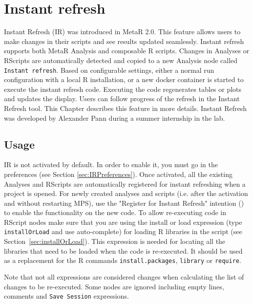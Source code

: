 

\chapter{Instant refresh}\label{chap:InstantRefresh}
Instant Refresh (IR) was introduced in MetaR 2.0. This feature allows users to make changes in their scripts and see results updated seamlessly. Instant refresh supports both MetaR Analysis and composable R scripts.  
Changes in Analyses or RScripts are automatically detected and copied to a new Analysis node called \texttt{Instant refresh}. Based on configurable settings, either a normal run configuration with a local R installation, or a new docker container is started to execute the instant refresh code. Executing the code regenerates tables or plots and updates the display. Users can follow progress of the refresh in the Instant Refresh tool. This Chapter describes this feature in more details. Instant Refresh was developed by Alexander Pann during a summer internship in the lab.

\section{Usage}
IR is not activated by default. In order to enable it, you must go in the preferences (see Section \ref{sec:IRPreferences}). Once activated, all the existing Analyses and RScripts are automatically registered for instant refreshing when a project is opened. For newly created analyses and scripts (i.e. after the activation and without restarting MPS), use the "Register for Instant Refresh" intention (\intentionLightBulb) to enable the functionality on the new code.  
To allow re-executing code in RScript nodes make sure that you are using
the install or load expression (type \texttt{installOrLoad} and use auto-complete) for loading R libraries in the script (see Section~\ref{sec:installOrLoad}). This expression is needed for locating all the libraries
that need to be loaded when the code is re-executed. It should be used as a
replacement for the R commands \texttt{install.packages}, \texttt{library} or \texttt{require}.

\begin{remark}
Note that not all expressions are considered changes when calculating the list of changes to be re-executed. Some nodes are ignored including empty lines, comments and \texttt{Save Session} expressions.
\end{remark}

